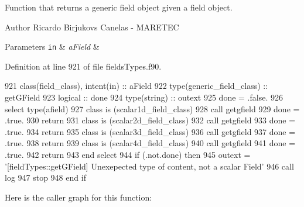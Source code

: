 Function that returns a generic field object given a field object. 

\begin{DoxyAuthor}{Author}
Ricardo Birjukovs Canelas -\/ M\+A\+R\+E\+T\+EC 
\end{DoxyAuthor}

\begin{DoxyParams}[1]{Parameters}
\mbox{\tt in}  & {\em a\+Field} & \\
\hline
\end{DoxyParams}


Definition at line 921 of file fields\+Types.\+f90.


\begin{DoxyCode}
921     \textcolor{keywordtype}{class}(field\_class), \textcolor{keywordtype}{intent(in)} :: aField
922     \textcolor{keywordtype}{type}(generic\_field\_class) :: getGField
923     \textcolor{keywordtype}{logical} :: done
924     \textcolor{keywordtype}{type}(string) :: outext
925     done = .false.
926     \textcolor{keywordflow}{select type}(afield)
927 \textcolor{keywordflow}{    class is} (scalar1d\_field\_class)
928         \textcolor{keyword}{call }getgfield%
929         done = .true.
930         \textcolor{keywordflow}{return}
931 \textcolor{keywordflow}{    class is} (scalar2d\_field\_class)
932         \textcolor{keyword}{call }getgfield%
933         done = .true.
934         \textcolor{keywordflow}{return}
935 \textcolor{keywordflow}{    class is} (scalar3d\_field\_class)
936         \textcolor{keyword}{call }getgfield%
937         done = .true.
938         \textcolor{keywordflow}{return}
939 \textcolor{keywordflow}{    class is} (scalar4d\_field\_class)
940         \textcolor{keyword}{call }getgfield%
941         done = .true.
942         \textcolor{keywordflow}{return}
943 \textcolor{keywordflow}{    end select}
944     \textcolor{keywordflow}{if} (.not.done) \textcolor{keywordflow}{then}
945         outext = \textcolor{stringliteral}{'[fieldTypes::getGField] Unexepected type of content, not a scalar Field'}
946         \textcolor{keyword}{call }log%
947         stop
948 \textcolor{keywordflow}{    end if}
\end{DoxyCode}
Here is the caller graph for this function\+:
\mbox{\label{namespacefieldtypes__mod_abd34452f9afd91c4b9eeb60c51908312}} 
